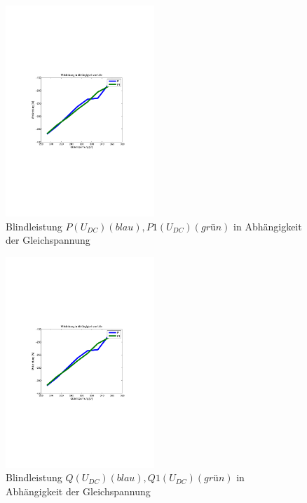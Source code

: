 \begin{figure}[H]
  \begin{center}
  \includegraphics[width=0.5\textwidth, trim={1cm 6.5cm 2cm 7cm},clip]{pic/6_1_grundfrequenztaktung/6_1_2_einst_wirk_und_blindleistung/P_P1_Udc.pdf}
  \caption{Blindleistung $P(U_{DC}) (blau), P1(U_{DC}) (grün)$ in Abhängigkeit der Gleichspannung}
  \label{fig:6_1_2_4}
  \end{center}
\end{figure}


\begin{figure}[H]
  \begin{center}
  \includegraphics[width=0.5\textwidth, trim={1cm 6.5cm 2cm 7cm},clip]{pic/6_1_grundfrequenztaktung/6_1_2_einst_wirk_und_blindleistung/P_P1_Udc.pdf}
  \caption{Blindleistung $Q(U_{DC}) (blau), Q1(U_{DC}) (grün)$ in Abhängigkeit der Gleichspannung}
  \label{fig:6_1_2_5}
  \end{center}
\end{figure}

\clearpage